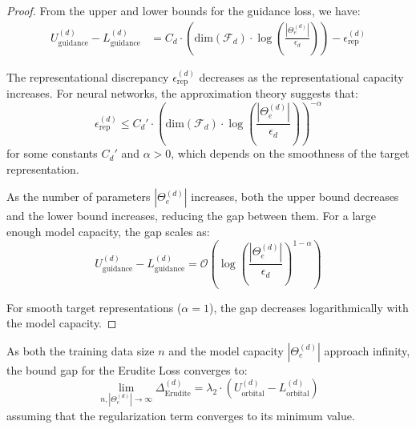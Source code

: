 \begin{proof}
From the upper and lower bounds for the guidance loss, we have:
\begin{align}
U_{\text{guidance}}^{(d)} - L_{\text{guidance}}^{(d)} &= C_d \cdot \left(\text{dim}(\mathcal{F}_d) \cdot \log\left(\frac{|\Theta_e^{(d)}|}{\epsilon_d}\right)\right) - \epsilon_{\text{rep}}^{(d)}
\end{align}

The representational discrepancy $\epsilon_{\text{rep}}^{(d)}$ decreases as the representational capacity increases. For neural networks, the approximation theory suggests that:
\begin{equation}
\epsilon_{\text{rep}}^{(d)} \leq C_d' \cdot \left(\text{dim}(\mathcal{F}_d) \cdot \log\left(\frac{|\Theta_e^{(d)}|}{\epsilon_d}\right)\right)^{-\alpha}
\end{equation}
for some constants $C_d'$ and $\alpha > 0$, which depends on the smoothness of the target representation.

As the number of parameters $|\Theta_e^{(d)}|$ increases, both the upper bound decreases and the lower bound increases, reducing the gap between them. For a large enough model capacity, the gap scales as:
\begin{equation}
U_{\text{guidance}}^{(d)} - L_{\text{guidance}}^{(d)} = \mathcal{O}\left(\log\left(\frac{|\Theta_e^{(d)}|}{\epsilon_d}\right)^{1-\alpha}\right)
\end{equation}

For smooth target representations ($\alpha = 1$), the gap decreases logarithmically with the model capacity.
\end{proof}

\begin{theorem}
As both the training data size $n$ and the model capacity $|\Theta_e^{(d)}|$ approach infinity, the bound gap for the Erudite Loss converges to:
\begin{equation}
\lim_{n,|\Theta_e^{(d)}| \to \infty} \Delta_{\text{Erudite}}^{(d)} = \lambda_2 \cdot \left(U_{\text{orbital}}^{(d)} - L_{\text{orbital}}^{(d)}\right)
\end{equation}
assuming that the regularization term converges to its minimum value.
\end{theorem}

